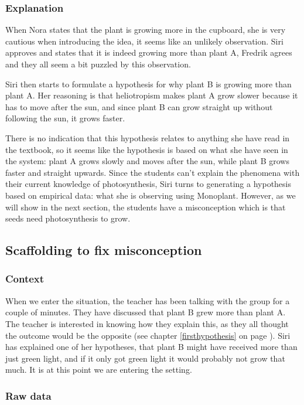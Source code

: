 \subsubsection*{Explanation}
When Nora states that the plant is growing more in the cupboard, she is very cautious when introducing the idea, it seems like an unlikely observation. Siri approves and states that it is indeed growing more than plant A, Fredrik agrees and they all seem a bit puzzled by this observation.

Siri then starts to formulate a hypothesis for why plant B is growing more than plant A. Her reasoning is that heliotropism makes plant A grow slower because it has to move after the sun, and since plant B can grow straight up without following the sun, it grows faster. 

There is no indication that this hypothesis relates to anything she have read in the textbook, so it seems like the hypothesis is based on what she have seen in the system: plant A grows slowly and moves after the sun, while plant B grows faster and straight upwards. Since the students can't explain the phenomena with their current knowledge of photosynthesis, Siri turns to generating a hypothesis based on empirical data: what she is observing using Monoplant. However, as we will show in the next section, the students have a misconception which is that seeds need photosynthesis to grow.


\subsection{Scaffolding to fix misconception}

\subsubsection*{Context}
When we enter the situation, the teacher has been talking with the group for a couple of minutes. They have discussed that plant B grew more than plant A. The teacher is interested in knowing how they explain this, as they all thought the outcome would be the opposite (see chapter \ref{firsthypothesis} on page \pageref{firsthypothesis}). Siri has explained one of her hypotheses, that plant B might have received more than just green light, and if it only got green light it would probably not grow that much.  It is at this point we are entering the setting.
 
\subsubsection*{Raw data}

